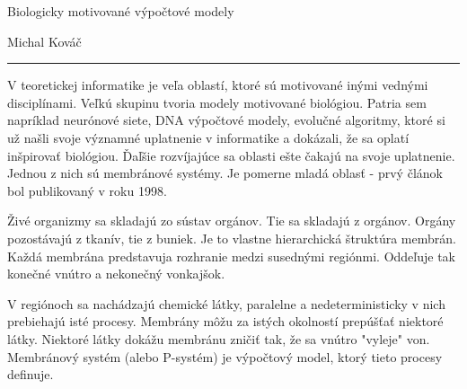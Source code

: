 \documentclass{article}
\def\header#1#2{
\centerline{\Large\sc #1}
\medskip
\centerline{\large #2}
\vspace{-\baselineskip}\rightline{\today}
\bigskip\hrule\bigskip
}
\begin{document}
\header{Biologicky motivované výpočtové modely}{Michal Kováč}

V teoretickej informatike je veľa oblastí, ktoré sú motivované inými vednými disciplínami. Veľkú skupinu tvoria modely motivované biológiou. Patria sem napríklad neurónové siete, DNA výpočtové modely, evolučné algoritmy, ktoré si už našli svoje významné uplatnenie v informatike a dokázali, že sa oplatí inšpirovať biológiou. Ďaľšie rozvíjajúce sa oblasti ešte čakajú na svoje uplatnenie. Jednou z nich sú membránové systémy. Je pomerne mladá oblasť - prvý článok bol publikovaný v roku 1998.

Živé organizmy sa skladajú zo sústav orgánov. Tie sa skladajú z orgánov. Orgány pozostávajú z tkanív, tie z buniek. Je to vlastne hierarchická štruktúra membrán. Každá membrána predstavuja rozhranie medzi susednými regiónmi. Oddeľuje tak konečné vnútro a nekonečný vonkajšok.

V regiónoch sa nachádzajú chemické látky, paralelne a nedeterministicky v nich prebiehajú isté procesy. Membrány môžu za istých okolností prepúšťať niektoré látky. Niektoré látky dokážu membránu zničiť tak, že sa vnútro "vyleje" von. Membránový systém (alebo P-systém) je výpočtový model, ktorý tieto procesy definuje.
\end{document}
